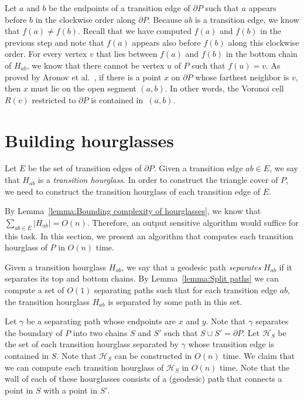 \documentclass[a4paper,UKenglish]{lipics}
\newcommand{\ff}[1]{\ensuremath{f(#1)}}
\begin{document}
Let $a$ and $b$ be the endpoints of a transition edge of $\partial P$ such that $a$ appears before $b$ in the clockwise order along $\partial P$. Because $ab$ is a transition edge, we know that $\ff{a}\neq \ff{b}$.
Recall that we have computed $\ff{a}$ and $\ff{b}$ in the previous step and note that $\ff{a}$ appears also before $\ff{b}$ along this clockwise order. 
For every vertex $v$ that lies between $\ff{a}$ and $\ff{b}$ in the bottom chain of $H_{ab}$, we know that there cannot be vertex $u$ of $P$ such that $\ff{u} = v$.
As proved by Aronov et al.~\cite[Corollary 2.7.4]{aronov1993furthest}, 
if there is a point $x$ on $\partial P$ whose farthest neighbor is $v$, then $x$ must lie on the open segment $(a,b)$. 
In other words, the Voronoi cell $R(v)$ restricted to $\partial P$ is contained in~$(a,b)$.

\section{Building hourglasses}\label{Section: Building hourglasses}

Let $E$ be the set of transition edges of $\partial P$.
Given a transition edge $ab\in E$, we say that $H_{ab}$ is a \emph{transition hourglass}.
In order to construct the triangle cover of $P$, 
we need to construct the transition hourglass of each transition edge of $E$.

By Lemma~\ref{lemma:Bounding complexity of hourglasses}, we know that $\sum_{ab\in E} |H_{ab}| = O(n)$.
Therefore, an output sensitive algorithm would suffice for this task. 
In this section, we present an algorithm that computes each transition hourglass of $P$ in $O(n)$ time.

Given a transition hourglass $H_{ab}$, we say that a geodesic path \emph{separates} $H_{ab}$ if it separates its top and bottom chains.
By Lemma~\ref{lemma:Split paths} we can compute a set of $O(1)$ separating paths such that for each transition edge $ab$, the transition hourglass $H_{ab}$ is separated by some path in this set.

Let $\gamma$ be a separating path whose endpoints are $x$ and $y$. 
Note that $\gamma$ separates the boundary of $P$ into two chains $S$ and $S'$ such that $S\cup S' = \partial P$.
Let $\mathcal H_S$ be the set of each transition hourglass separated by $\gamma$ whose transition edge is contained in $S$.
Note that $\mathcal H_S$ can be constructed in $O(n)$ time.
We claim that we can compute each transition hourglass of $\mathcal H_S$ in $O(n)$ time.
Note that the wall of each of these hourglasses consists of a (geodesic) path that connects a point in $S$ with a point in $S'$.
\end{document}
